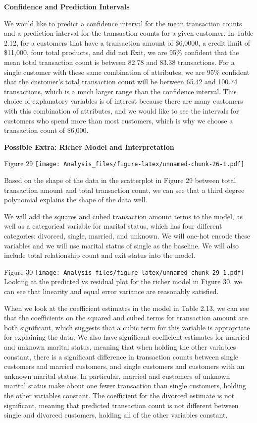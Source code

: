 \documentclass[
]{article}
\begin{document}
\textbf{Confidence and Prediction Intervals}

We would like to predict a confidence interval for the mean transaction
counts and a prediction interval for the transaction counts for a given
customer. In Table 2.12, for a customers that have a transaction amount
of \$6,0000, a credit limit of \$11,000, four total products, and did
not Exit, we are 95\% confident that the mean total transaction count is
between 82.78 and 83.38 transactions. For a single customer with these
same combination of attributes, we are 95\% confident that the
customer's total transaction count will be between 65.42 and 100.74
transactions, which is a much larger range than the confidence interval.
This choice of explanatory variables is of interest because there are
many customers with this combination of attributes, and we would like to
see the intervals for customers who spend more than most customers,
which is why we choose a transaction count of \$6,000.

\textbf{Possible Extra: Richer Model and Interpretation}

Figure 29
\texttt{[image: Analysis\_files/figure-latex/unnamed-chunk-26-1.pdf]}

Based on the shape of the data in the scatterplot in Figure 29 between
total transaction amount and total transaction count, we can see that a
third degree polynomial explains the shape of the data well.

We will add the squares and cubed transaction amount terms to the model,
as well as a categorical variable for marital status, which has four
different categories: divorced, single, married, and unknown. We will
one-hot encode these variables and we will use marital status of single
as the baseline. We will also include total relationship count and exit
status into the model.

Figure 30
\texttt{[image: Analysis\_files/figure-latex/unnamed-chunk-29-1.pdf]}
Looking at the predicted vs residual plot for the richer model in Figure
30, we can see that linearity and equal error variance are reasonably
satisfied.

When we look at the coefficient estimates in the model in Table 2.13, we
can see that the coefficients on the squared and cubed terms for
transaction amount are both significant, which suggests that a cubic
term for this variable is appropriate for explaining the data. We also
have significant coefficient estimates for married and unknown marital
status, meaning that when holding the other variables constant, there is
a significant difference in transaction counts between single customers
and married customers, and single customers and customers with an
unknown marital status. In particular, married and customers of unknown
marital status make about one fewer transaction than single customers,
holding the other variables constant. The coefficient for the divorced
estimate is not significant, meaning that predicted transaction count is
not different between single and divorced customers, holding all of the
other variables constant.
\end{document}
